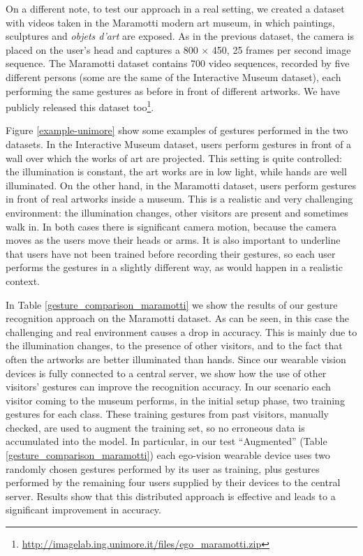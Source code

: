 On a different note, to test our approach in a real setting, we created a dataset with videos taken in the Maramotti modern art museum, in which paintings, sculptures and \textit{objets d'art} are exposed. As in the previous dataset, the camera is placed on the user's head and captures a 800 $\times$ 450, 25 frames per second image sequence. The Maramotti dataset contains 700 video sequences, recorded by five different persons (some are the same of the Interactive Museum dataset), each performing the same gestures as before in front of different artworks. We have publicly released this dataset too\footnote{\url{ http://imagelab.ing.unimore.it/files/ego_maramotti.zip}}.
   
Figure \ref{example-unimore} show some examples of gestures performed in the two datasets. In the Interactive Museum dataset, users perform gestures in front of a wall over which the works of art are projected. This setting is quite controlled: the illumination is constant, the art works are in low light, while hands are well illuminated. On the other hand, in the Maramotti dataset, users perform gestures in front of real artworks inside a museum. This is a realistic and very challenging environment: the illumination changes, other visitors are present and sometimes walk in. In both cases there is significant camera motion, because the camera moves as the users move their heads or arms. It is also important to underline that users have not been trained before recording their gestures, so each user performs the gestures in a slightly different way, as would happen in a realistic context.  

In Table \ref{gesture_comparison_maramotti} we show the results of our gesture recognition approach on the Maramotti dataset. As can be seen, in this case the challenging and real environment causes a drop in accuracy. This is mainly due to the illumination changes, to the presence of other visitors, and to the fact that often the artworks are better illuminated than hands.
Since our wearable vision devices is fully connected to a central server, we show how the use of other visitors' gestures can improve the recognition accuracy.
In our scenario each visitor coming to the museum performs, in the initial setup phase, two training gestures for each class. These training gestures from past visitors, manually checked, are used to augment the training set, so no erroneous data is accumulated into the model. In particular, in our test ``Augmented'' (Table \ref{gesture_comparison_maramotti}) each ego-vision wearable device uses two randomly chosen gestures performed by its user as training, plus gestures performed by the remaining four users supplied by their devices to the central server. Results show that this distributed approach is effective and leads to a significant improvement in accuracy.


